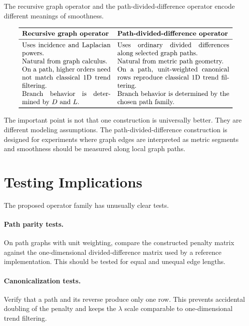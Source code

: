 \documentclass[11pt]{article}
\begin{document}
The recursive graph operator and the path-divided-difference operator encode
different meanings of smoothness.

\[
\begin{array}{p{0.38\linewidth}p{0.48\linewidth}}
\toprule
\textbf{Recursive graph operator} & \textbf{Path-divided-difference operator}\\
\midrule
Uses incidence and Laplacian powers. &
Uses ordinary divided differences along selected graph paths.\\
Natural from graph calculus. &
Natural from metric path geometry.\\
On a path, higher orders need not match classical 1D trend filtering. &
On a path, unit-weighted canonical rows reproduce classical 1D trend filtering.\\
Branch behavior is determined by \(D\) and \(L\). &
Branch behavior is determined by the chosen path family.\\
\bottomrule
\end{array}
\]

The important point is not that one construction is universally better.  They
are different modeling assumptions.  The path-divided-difference construction
is designed for experiments where graph edges are interpreted as metric
segments and smoothness should be measured along local graph paths.

\section{Testing Implications}

The proposed operator family has unusually clear tests.

\paragraph{Path parity tests.}
On path graphs with unit weighting, compare the constructed penalty matrix
against the one-dimensional divided-difference matrix used by a reference
implementation.  This should be tested for equal and unequal edge lengths.

\paragraph{Canonicalization tests.}
Verify that a path and its reverse produce only one row.  This prevents
accidental doubling of the penalty and keeps the \(\lambda\) scale comparable
to one-dimensional trend filtering.
\end{document}
